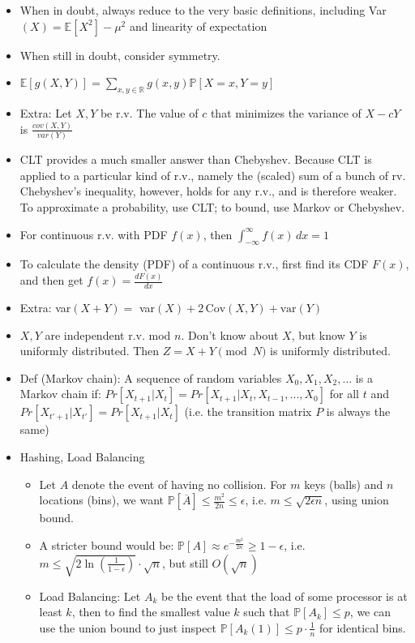 \documentclass{article}
\begin{document}
\begin{itemize}
	\item When in doubt, always reduce to the very basic definitions, including Var$(X) = \mathbb{E}[X^2] - \mu^2$ and linearity of expectation
	\item When still in doubt, consider {\color{red} symmetry}.
	\item $\mathbb{E}[g(X,Y)] = \sum\limits_{x,y\in\mathbb{R}}g(x,y)\mathbb{P}[X=x,Y=y]$
	\item Extra: Let $X,Y$ be r.v. The value of $c$ that minimizes the variance of $X-cY$ is $\frac{cov(X,Y)}{var(Y)}$
	\item CLT provides a much smaller answer than Chebyshev. Because CLT is applied to a particular kind of r.v., namely the (scaled) sum of a bunch of rv. Chebyshev’s inequality, however, holds for any r.v., and is therefore weaker. To approximate a probability, use CLT; to bound, use Markov or Chebyshev.
	\item For continuous r.v. with PDF $f(x)$, then $\int_{-\infty}^{\infty} f(x)\,dx = 1$
	\item To calculate the density (PDF) of a continuous r.v., first find its CDF $F(x)$, and then get $f(x) = \frac{dF(x)}{dx}$
	\item Extra: var$(X+Y) =$ var$(X) + 2\,\text{Cov}(X,Y) + \text{var}(Y)$
	\item $X,Y$ are independent r.v. mod $n$. Don't know about $X$, but know $Y$ is uniformly distributed. Then $Z = X+Y\pmod{N}$ is uniformly distributed.
	\item Def (Markov chain): A sequence of random variables $X_0,X_1,X_2,...$ is a Markov chain if: $Pr[X_{t+1} |X_t] = Pr[X_{t+1} |X_t,X_{t-1},...,X_0]$ for all $t$ and $Pr[X_{t'+1} | X_{t'}] = Pr[X_{t+1} | X_t]$ (i.e. the transition matrix $P$ is always the same)

	\item Hashing, Load Balancing
	\begin{itemize}
		\item Let $A$ denote the event of having no collision. For $m$ keys (balls) and $n$ locations (bins), we want $\mathbb{P}[\overline{A}] \leq \frac{m^2}{2n} \leq \epsilon$, i.e. $m\leq \sqrt{2\epsilon n}$, using union bound.
		\item A stricter bound would be: $\mathbb{P}[A] \approx e^{-\frac{m^2}{2n}} \geq 1-\epsilon$, i.e. $m \leq \sqrt{2\ln(\frac{1}{1-\epsilon})}\cdot\sqrt{n}$, but still $O(\sqrt{n})$
		\item Load Balancing: Let $A_k$ be the event that the load of some processor is at least $k$, then to find the smallest value $k$ such that $\mathbb{P}[A_k] \leq p$, we can use the union bound to just inspect $\mathbb{P}[A_k(1)] \leq p\cdot\frac{1}{n}$ for identical bins.
	\end{itemize}
	

\end{itemize}
\end{document}
